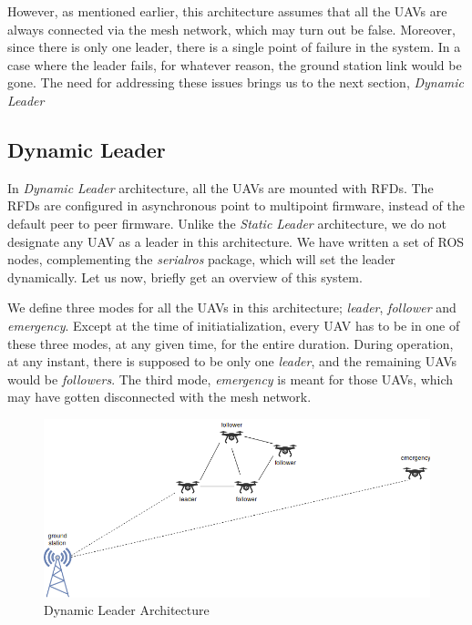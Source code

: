 However, as mentioned earlier, this architecture assumes that all the UAVs are always connected via the mesh network, which may turn out be false. Moreover, since there is only one leader, there is a single point of failure in the system. In a case where the leader fails, for whatever reason, the ground station link would be gone. The need for addressing these issues brings us to the next section, \textit{Dynamic Leader}

\subsection{Dynamic Leader}
In \textit{Dynamic Leader} architecture, all the UAVs are mounted with RFDs. The RFDs are configured in asynchronous point to multipoint firmware, instead of the default peer to peer firmware. Unlike the \textit{Static Leader} architecture, we do not designate any UAV as a leader in this architecture. We have written a set of ROS nodes, complementing the \textit{serialros} package, which will set the leader dynamically. Let us now, briefly get an overview of this system.

We define three modes for all the UAVs in this architecture; \textit{leader}, \textit{follower} and \textit{emergency}. Except at the time of initiatialization, every UAV has to be in one of these three modes, at any given time, for the entire duration. During operation, at any instant, there is supposed to be only one \textit{leader}, and the remaining UAVs would be \textit{followers}. The third mode, \textit{emergency} is meant for those UAVs, which may have gotten disconnected with the mesh network.

\begin{figure}[h]
	\centering
	\includegraphics[scale=0.5]{Pictures/dynamicLeader.png}
	\caption{Dynamic Leader Architecture}
	\label{fig: dynamicLeader}
\end{figure}

